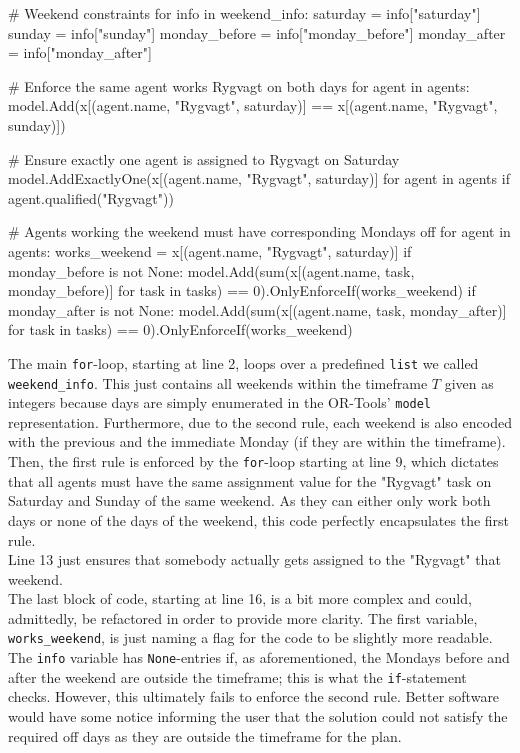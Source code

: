 \begin{python}
# Weekend constraints
for info in weekend_info:
    saturday = info["saturday"]
    sunday = info["sunday"]
    monday_before = info["monday_before"]
    monday_after = info["monday_after"]

    # Enforce the same agent works Rygvagt on both days
    for agent in agents:
        model.Add(x[(agent.name, "Rygvagt", saturday)] == x[(agent.name, "Rygvagt", sunday)])

    # Ensure exactly one agent is assigned to Rygvagt on Saturday
    model.AddExactlyOne(x[(agent.name, "Rygvagt", saturday)] for agent in agents if agent.qualified("Rygvagt"))

    # Agents working the weekend must have corresponding Mondays off
    for agent in agents:
        works_weekend = x[(agent.name, "Rygvagt", saturday)]
        if monday_before is not None:
            model.Add(sum(x[(agent.name, task, monday_before)] for task in tasks) == 0).OnlyEnforceIf(works_weekend)
        if monday_after is not None:
            model.Add(sum(x[(agent.name, task, monday_after)] for task in tasks) == 0).OnlyEnforceIf(works_weekend)
\end{python}
The main \texttt{for}-loop, starting at line 2, loops over a predefined \texttt{list} we called \texttt{weekend_info}. This just contains all weekends within the timeframe \(T\) given as integers because days are simply enumerated in the OR-Tools' \texttt{model} representation. Furthermore, due to the second rule, each weekend is also encoded with the previous and the immediate Monday (if they are within the timeframe). 
\\
Then, the first rule is enforced by the \texttt{for}-loop starting at line 9, which dictates that all agents must have the same assignment value for the "Rygvagt" task on Saturday and Sunday of the same weekend. As they can either only work both days or none of the days of the weekend, this code perfectly encapsulates the first rule.
\\
Line 13 just ensures that somebody actually gets assigned to the "Rygvagt" that weekend.
\\
The last block of code, starting at line 16, is a bit more complex and could, admittedly, be refactored in order to provide more clarity. The first variable, \texttt{works_weekend}, is just naming a flag for the code to be slightly more readable. The \texttt{info} variable has \texttt{None}-entries if, as aforementioned, the Mondays before and after the weekend are outside the timeframe; this is what the \texttt{if}-statement checks. However, this ultimately fails to enforce the second rule. Better software would have some notice informing the user that the solution could not satisfy the required off days as they are outside the timeframe for the plan.

